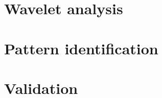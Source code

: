 \section{Wavelet analysis}

\section{Pattern identification}

\section{Validation}

\begin{comment}
\section{Wavelets in software evolution}
The use of wavelet transformation in the analysis of software evolution removes
the factor of project size and enables comparing projects equally to find
similar sequences.

\paragraph{}
In software evolution, the signal can be any measurable property of an evolving
entity, such as team size, lines of code, number of commits, etc.
These properties can be measured at a given time series, such as age in months,
or even a non-time-related series such as lines of code. Measuring these
properties over the evolution of a project gives a series of signals. Software
repositories are a source of signals in software evolution. This allows wavelet
transform be applied directly for mining software repositories.

\section{Warning signs}
\subsection{Dead projects}
The validation of the sequence identification was done by first classifying
a subset of the data set containing only dead projects. A dead project is
defined as a project that had no change in LOC in the past 12 months.\\

The list of dead projects is then used to filter the sequences detected by
these dead projects. The resulting set of sequences contains just the sequences
in dead projects. Each sequence is related to other sequences in other projects
which might be dead or not. These related projects are evaluated by checking if
they exist in the dead projects list.


\end{comment}
